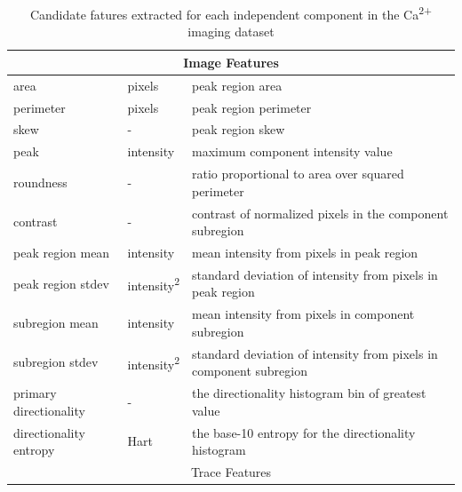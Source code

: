 \documentclass[10pt]{article}
\newcommand{\calcium}[0]{Ca\textsuperscript{2+}}
\begin{document}
\begin{table}[h]
  \centering
  \small
  \caption{Candidate fatures extracted for each independent component in the {\calcium} imaging dataset}
  \label{table:allfeatures}
  \begin{tabular}{lll}
    \toprule
    \multicolumn{3}{c}{Image Features} \\
    \midrule

    area & pixels & peak region area  \\
    \addlinespace[2pt]
    perimeter & pixels & peak region perimeter \\
    \addlinespace[2pt]
    skew & - & peak region skew \\
    \addlinespace[2pt]
    peak & intensity &  maximum component intensity value  \\
    \addlinespace[2pt]
    roundness & - &  ratio proportional to area over squared perimeter\\
    \addlinespace[2pt]
    contrast & - &  contrast of normalized pixels in the component subregion \\
    \addlinespace[2pt]
    peak region mean & intensity &  mean intensity from pixels in peak region \\
    \addlinespace[2pt]
    peak region stdev & intensity\textsuperscript{2} & standard deviation of intensity from pixels in peak region \\
    \addlinespace[2pt]
    subregion mean & intensity &  mean intensity from pixels in component subregion \\
    \addlinespace[2pt]
    subregion stdev & intensity\textsuperscript{2} &  standard deviation of intensity from pixels in component subregion \\
    \addlinespace[2pt]
    primary directionality & - &  the directionality histogram bin of greatest value \\
    \addlinespace[2pt]
    directionality entropy & Hart &  the base-\num{10} entropy for the directionality histogram \\
    \midrule
    \multicolumn{3}{c}{Trace Features} \\
    \midrule


\end{tabular}
\end{table}
\end{document}
